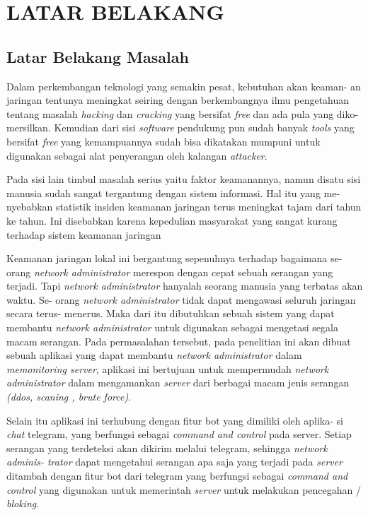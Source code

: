 
\chapter{LATAR BELAKANG}

\section{Latar Belakang Masalah}
Dalam perkembangan teknologi yang semakin pesat, kebutuhan akan keaman-
an jaringan tentunya meningkat seiring dengan berkembangnya ilmu pengetahuan
tentang masalah \emph{hacking} dan \emph{cracking} yang bersifat \emph{free} dan ada pula yang diko-
mersilkan. Kemudian dari sisi \emph{software} pendukung pun sudah banyak \emph{tools} yang
bersifat \emph{free} yang kemampuannya sudah bisa dikatakan mumpuni untuk digunakan
sebagai alat penyerangan oleh kalangan \emph{attacker}.

Pada sisi lain timbul masalah serius yaitu faktor keamanannya, namun disatu
sisi manusia sudah sangat tergantung dengan sistem informasi. Hal itu yang me-
nyebabkan statistik insiden keamanan jaringan terus meningkat tajam dari tahun ke
tahun. Ini disebabkan karena kepedulian masyarakat yang sangat kurang terhadap
sistem keamanan jaringan

Keamanan jaringan lokal ini bergantung sepenuhnya terhadap bagaimana se-
orang \emph{network administrator} merespon dengan cepat sebuah serangan yang terjadi.
Tapi \emph{network administrator} hanyalah seorang manusia yang terbatas akan waktu. Se-
orang \emph{network administrator} tidak dapat mengawasi seluruh jaringan secara terus-
menerus. Maka dari itu dibutuhkan sebuah sistem yang dapat membantu \emph{network
administrator} untuk digunakan sebagai mengetasi segala macam serangan.
Pada permasalahan tersebut, pada penelitian ini akan dibuat sebuah aplikasi
yang dapat membantu \emph{network administrator} dalam \emph{memonitoring server}, aplikasi ini
bertujuan untuk mempermudah \emph{network administrator} dalam mengamankan \emph{server}
dari berbagai macam jenis serangan \emph{(ddos, scaning , brute force)}.
 
Selain itu aplikasi ini terhubung dengan fitur bot yang dimiliki oleh aplika-
si \emph{chat} telegram, yang berfungsi sebagai \emph{command and control} pada server. Setiap
serangan yang terdeteksi akan dikirim melalui telegram, sehingga \emph{network adminis-
trator} dapat mengetahui serangan apa saja yang terjadi pada \emph{server} ditambah dengan
fitur bot dari telegram yang berfungsi sebagai \emph{command and control} yang digunakan
untuk memerintah \emph{server} untuk melakukan pencegahan / \emph{bloking}.

